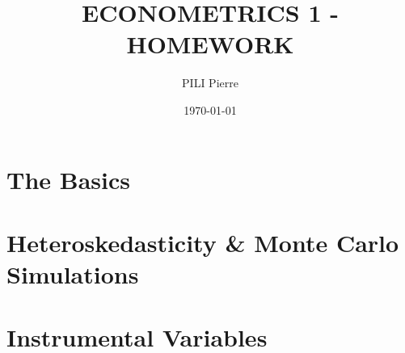 \documentclass[12pt]{article}
\title{ECONOMETRICS 1 - HOMEWORK}
\author{PILI Pierre}
\date{\today}
\begin{document}
\maketitle

\section{The Basics}


\section{Heteroskedasticity \& Monte Carlo Simulations}


\section{Instrumental Variables}

\end{document}
